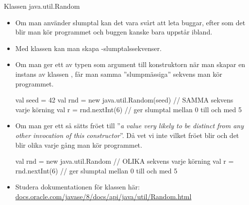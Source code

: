 


\begin{Slide}{Klassen java.util.Random}\SlideFontTiny
\begin{itemize}
\item Om man använder slumptal kan det vara svårt att leta buggar, efter som det blir  man kör programmet och buggen kanske bara uppstår ibland.

\item Med klassen  kan man skapa -slumptalssekvenser.
\pause
\item Om man ger ett   av typen  som argument till konstruktorn när man skapar en instans av klassen , får man samma ''slumpmässiga'' sekvens  man kör programmet.

\begin{Code}
  val seed = 42
  val rnd = new java.util.Random(seed)  // SAMMA sekvens varje körning
  val r = rnd.nextInt(6) // ger slumptal mellan 0 till och med 5
\end{Code}
\pause
\item Om man  ger ett  så sätts fröet till ''\emph{a value very likely to be distinct from any other invocation of this constructor}''. Då vet vi inte vilket fröet blir och det blir olika varje gång man kör programmet.
\begin{Code}
  val rnd = new java.util.Random  // OLIKA sekvens varje körning
  val r = rnd.nextInt(6) // ger slumptal mellan 0 till och med 5
\end{Code}
\pause
\item Studera dokumentationen för klassen  här:\\ \href{https://docs.oracle.com/javase/8/docs/api/java/util/Random.html}{\SlideFontSmall docs.oracle.com/javase/8/docs/api/java/util/Random.html}

\end{itemize}
\end{Slide}

%
%
%
%
